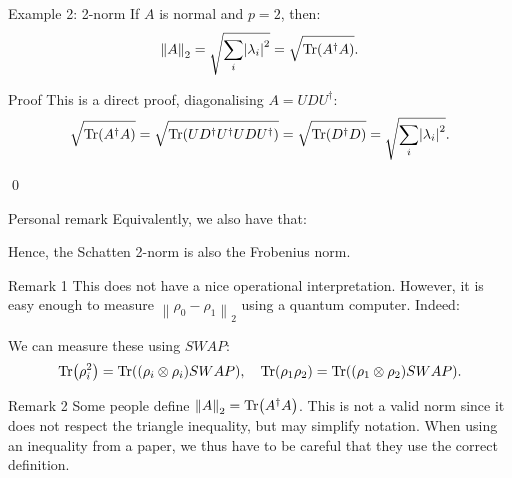 \documentclass[a4paper]{article}
\begin{document}
\begin{parag}{Example 2: 2-norm}
    If $A$ is normal and $p = 2$, then: 
    \[\left\|A\right\|_2 = \sqrt{\sum_{i} \left|\lambda_i\right|^2} = \sqrt{\Tr\left(A^{\dagger} A\right)}.\]

    \begin{subparag}{Proof}
        This is a direct proof, diagonalising $A = U D U ^{\dagger}$: 
        \[\sqrt{\Tr\left(A^{\dagger} A\right)} = \sqrt{\Tr\left(U D^{\dagger} U^{\dagger} U D U^{\dagger}\right)} = \sqrt{\Tr\left(D^{\dagger} D\right)} = \sqrt{\sum_{i} \left|\lambda_i\right|^2}.\]

        \qed
    \end{subparag}
    
    \begin{subparag}{Personal remark}
        Equivalently, we also have that: 
        
        Hence, the Schatten 2-norm is also the Frobenius norm.
    \end{subparag}
    
    \begin{subparag}{Remark 1}
        This does not have a nice operational interpretation. However, it is easy enough to measure $\left\|\rho_0 - \rho_1\right\|_2$ using a quantum computer. Indeed: 

        We can measure these using $SWAP$: 
        \[\Tr\left(\rho_i^2\right) = \Tr\left(\left(\rho_i \otimes \rho_i\right) SWAP\right), \mathspace \Tr\left(\rho_1 \rho_2\right) = \Tr\left(\left(\rho_1 \otimes \rho_2\right) SWAP\right).\]
    \end{subparag}

    \begin{subparag}{Remark 2}
        Some people define $\left\|A\right\|_2 = \Tr\left(A^{\dagger} A\right)$. This is not a valid norm since it does not respect the triangle inequality, but may simplify notation. When using an inequality from a paper, we thus have to be careful that they use the correct definition.
    \end{subparag}
\end{parag}
\end{document}
